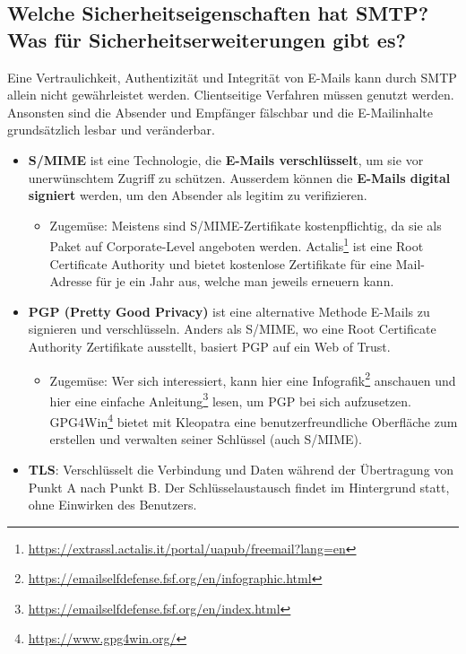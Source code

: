 \pagebreak
\subsection*{Welche Sicherheitseigenschaften hat SMTP? Was für Sicherheitserweiterungen gibt es?}
Eine Vertraulichkeit, Authentizität und Integrität von E-Mails kann durch SMTP allein nicht gewährleistet werden. Clientseitige Verfahren müssen genutzt werden. Ansonsten sind die Absender und Empfänger fälschbar und die E-Mailinhalte grundsätzlich lesbar und veränderbar.
\begin{itemize}
    \item \textbf{S/MIME} ist eine Technologie, die \textbf{E-Mails verschlüsselt}, um sie vor unerwünschtem Zugriff zu schützen. Ausserdem können die \textbf{E-Mails digital signiert} werden, um den Absender als legitim zu verifizieren.
    \begin{itemize}
        \item Zugemüse: Meistens sind S/MIME-Zertifikate kostenpflichtig, da sie als Paket auf Corporate-Level angeboten werden. Actalis\footnote{\url{https://extrassl.actalis.it/portal/uapub/freemail?lang=en}} ist eine Root Certificate Authority und bietet kostenlose Zertifikate für eine Mail-Adresse für je ein Jahr aus, welche man jeweils erneuern kann.
    \end{itemize}
    \item \textbf{PGP (Pretty Good Privacy)} ist eine alternative Methode E-Mails zu signieren und verschlüsseln. Anders als S/MIME, wo eine Root Certificate Authority Zertifikate ausstellt, basiert PGP auf ein Web of Trust.
    \begin{itemize}
        \item Zugemüse: Wer sich interessiert, kann hier eine Infografik\footnote{\url{https://emailselfdefense.fsf.org/en/infographic.html}} anschauen und hier eine einfache Anleitung\footnote{\url{https://emailselfdefense.fsf.org/en/index.html}} lesen, um PGP bei sich aufzusetzen. GPG4Win\footnote{\url{https://www.gpg4win.org/}} bietet mit Kleopatra eine benutzerfreundliche Oberfläche zum erstellen und verwalten seiner Schlüssel (auch S/MIME).
    \end{itemize}
    \item \textbf{TLS}: Verschlüsselt die Verbindung und Daten während der Übertragung von Punkt A nach Punkt B. Der Schlüsselaustausch findet im Hintergrund statt, ohne Einwirken des Benutzers.
\end{itemize}

